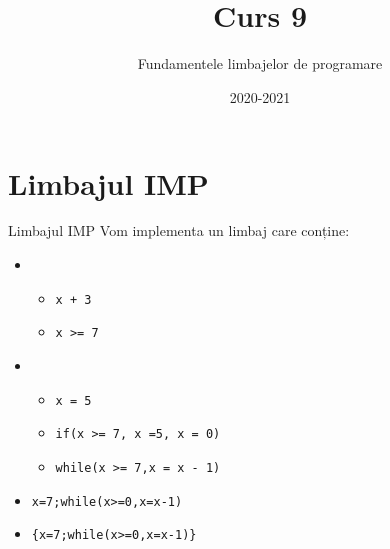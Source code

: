 \documentclass[xcolor=x11names,compress,10pt]{beamer}
\begin{document}
\title{\\Curs 9}
\author{Fundamentele limbajelor de programare} 
\date{2020-2021} 


\frame{\titlepage} 



\section{Limbajul IMP} \sectionframe




\begin{frame}{Limbajul IMP}
Vom implementa un limbaj care conține:

\medskip

\begin{itemize}
\item {}
	\begin{itemize}
		  \item {} \hfill \texttt{x + 3}
		  \item {} \hfill \texttt{x >= 7}
	\end{itemize}
\item {}
	\begin{itemize}
 		 \item {} \hfill \texttt{x = 5}
 		 \item {} \hfill \texttt{if(x >= 7,
 		  x =5, x = 0)}
		  \item {}  \hfill \texttt{while(x >= 7,x = x - 1)}
		  \end{itemize}
		  \item {}
		  \hfill\texttt{x=7;while(x>=0,x=x-1)}
		  \item {}
		  \hfill\texttt{\{x=7;while(x>=0,x=x-1)\}}
\end{itemize}


\end{frame}
\end{document}

